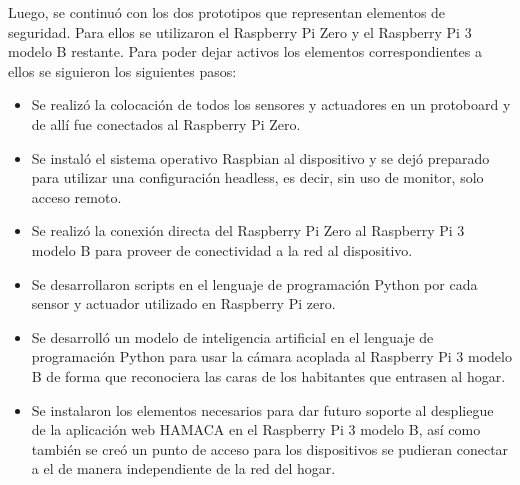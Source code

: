 Luego, se continuó con los dos prototipos que representan elementos de seguridad. Para ellos se utilizaron el Raspberry Pi Zero y el Raspberry Pi 3 modelo B restante. Para poder dejar activos los elementos correspondientes a ellos se siguieron los siguientes pasos:
\begin{itemize}
\item  Se realizó la colocación de todos los sensores y actuadores en un protoboard y de allí fue conectados al Raspberry Pi Zero.

\item Se instaló el sistema operativo Raspbian al dispositivo y se dejó preparado para utilizar una configuración headless, es decir, sin uso de monitor, solo acceso remoto.

\item Se realizó la conexión directa del Raspberry Pi Zero al Raspberry Pi 3 modelo B para proveer de conectividad a la red al dispositivo. 

\item Se desarrollaron scripts en el lenguaje de programación Python por cada sensor y actuador utilizado en Raspberry Pi zero.

\item Se desarrolló un modelo de inteligencia artificial en el lenguaje de programación Python para usar la cámara acoplada al Raspberry Pi 3 modelo B de forma que reconociera las caras de los habitantes que entrasen al hogar.  

\item Se instalaron los elementos necesarios para dar futuro soporte al despliegue de la aplicación web HAMACA en el Raspberry Pi 3 modelo B, así como también se creó un punto de acceso para los dispositivos se pudieran conectar a el de manera independiente de la red del hogar. 
\end{itemize}

